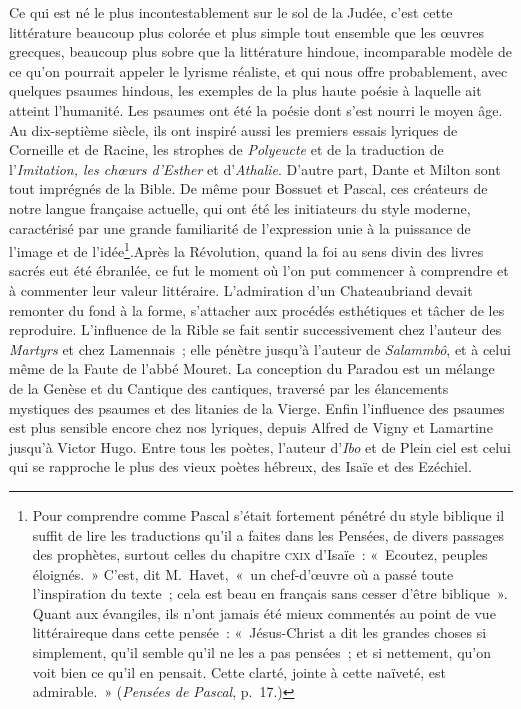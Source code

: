 \documentclass[french,twoside]{book} %
\begin{document}
Ce qui est né le plus incontestablement sur le sol de la Judée, c’est cette littérature beaucoup plus colorée et plus simple tout ensemble que les œuvres grecques, beaucoup plus sobre que la littérature hindoue, incomparable modèle de ce qu’on pourrait appeler le lyrisme réaliste, et qui nous offre probablement, avec quelques psaumes hindous, les exemples de la plus haute poésie à laquelle ait atteint l’humanité. Les psaumes ont été la poésie dont s’est nourri le moyen âge. Au dix-septième siècle, ils ont inspiré aussi les premiers essais lyriques de Corneille et de Racine, les strophes de \emph{Polyeucte} et de la traduction de l’\emph{Imitation, les chœurs d’Esther} et d’\emph{Athalie}. D’autre part, Dante et Milton sont tout imprégnés de la Bible. De même pour Bossuet et Pascal, ces créateurs de notre langue française actuelle, qui ont été les initiateurs du style moderne, caractérisé par une grande familiarité de l’expression unie à la puissance de l’image et de l’idée\footnote{ Pour comprendre comme Pascal s’était fortement pénétré du style biblique il suffit de lire les traductions qu’il a faites dans les Pensées, de divers passages des prophètes, surtout celles du chapitre \textsc{cxix} d’Isaïe : « Ecoutez, peuples éloignés. » C’est, dit M. Havet, « un chef-d’œuvre où a passé toute l’inspiration du texte ; cela est beau en français sans cesser d’être biblique ». Quant aux évangiles, ils n’ont jamais été mieux commentés au point de vue littéraireque dans cette pensée : « Jésus-Christ a dit les grandes choses si simplement, qu’il semble qu’il ne les a pas pensées ; et si nettement, qu’on voit bien ce qu’il en pensait. Cette clarté, jointe à cette naïveté, est admirable. » (\emph{Pensées de Pascal}, p. 17.)}.Après la Révolution, quand la foi au sens divin des livres sacrés eut été ébranlée, ce fut le moment où l’on put commencer à comprendre et à commenter leur valeur littéraire. L’admiration d’un Chateaubriand devait remonter du fond à la forme, s’attacher aux procédés esthétiques et tâcher de les reproduire. L’influence de la Rible se fait sentir successivement chez l’auteur des \emph{Martyrs} et chez Lamennais ; elle pénètre jusqu’à l’auteur de \emph{Salammbô}, et à celui même de la Faute de l’abbé Mouret. La conception du Paradou est un mélange de la Genèse et du Cantique des cantiques, traversé par les élancements mystiques des psaumes et des litanies de la Vierge. Enfin l’influence des psaumes est plus sensible encore chez nos lyriques, depuis Alfred de Vigny et Lamartine jusqu’à Victor Hugo. Entre tous les poètes, l’auteur d’\emph{Ibo} et de Plein ciel est celui qui se rapproche le plus des vieux poètes hébreux, des Isaïe et des Ezéchiel.\par
\end{document}
